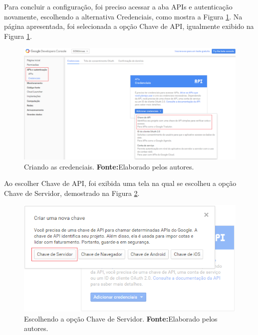 	\pagebreak

	\par Para concluir a configuração, foi preciso acessar a aba APIs e
autenticação novamente, escolhendo a alternativa Credenciais, como mostra a
Figura \ref{fig:gcm6}. Na página apresentada, foi selecionada a opção Chave de
API, igualmente exibido na Figura \ref{fig:gcm6}.

	\begin{figure}[h!] 
		\centerline{\includegraphics[scale=0.4]{./imagens/2_q_metodologico/4_procedimentos_resultados/41_gcm/gcm6.png}}
		\caption[Criando as credenciais]{Criando as credenciais.
		\textbf{Fonte:}Elaborado pelos autores.}
		\label{fig:gcm6}
	\end{figure}
	
	\par Ao escolher Chave de API, foi exibida uma tela na qual se escolheu a opção
Chave de Servidor, demostrado na Figura \ref{fig:gcm7}.

	\begin{figure}[h!] 
		\centerline{\includegraphics[scale=0.7]{./imagens/2_q_metodologico/4_procedimentos_resultados/41_gcm/gcm7.png}}
		\caption[Escolhendo a opção Chave de Servidor]{Escolhendo a opção Chave de Servidor.
		\textbf{Fonte:}Elaborado pelos autores.}
		\label{fig:gcm7}
	\end{figure}

